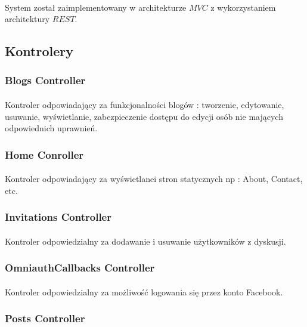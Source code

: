 \documentclass[wide,a4paper,titlepage,12pt] {article}
\begin{document}
  \paragraph{}
  System został zaimplementowany w architekturze $MVC$ z wykorzystaniem architektury $REST$.
  \subsection{Kontrolery}
    \subsubsection{Blogs Controller}
    \paragraph{}
      Kontroler odpowiadający za funkcjonalności blogów : tworzenie, edytowanie, usuwanie, wyświetlanie, zabezpieczenie dostępu do edycji osób nie mających odpowiednich uprawnień.
    \subsubsection{Home Conroller}
    \paragraph{} %
    \label{par:}
    Kontroler odpowiadający za wyświetlanei stron statycznych np : About, Contact, etc. 
    \subsubsection{Invitations Controller}
    \paragraph{}
    Kontroler odpowiedzialny za dodawanie i usuwanie użytkowników z dyskusji.

    \subsubsection{OmniauthCallbacks Controller}
    \paragraph{}
    Kontroler odpowiedzialny za możliwość logowania się przez konto Facebook.
    
    \subsubsection{Posts Controller}
\end{document}
